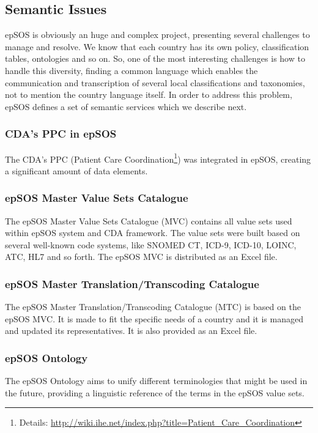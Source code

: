 \subsection{Semantic Issues}
epSOS is obviously an huge and complex project, presenting several challenges to manage and resolve. We know that each country has its own policy, classification tables, ontologies and so on. So, one of the most interesting challenges is how to handle this diversity, finding a common language which enables the communication and transcription of several local classifications and taxonomies, not to mention the country language itself. In order to address this problem, epSOS defines a set of semantic services which we describe next. 

\subsubsection{CDA's PPC in epSOS}
The CDA's PPC (Patient Care Coordination\footnote{Details: \url{http://wiki.ihe.net/index.php?title=Patient_Care_Coordination}}) was integrated in epSOS, creating a significant amount of data elements.

\subsubsection{epSOS Master Value Sets Catalogue}
The epSOS Master Value Sets Catalogue (MVC) contains all value sets used within epSOS system and CDA framework. The value sets were built based on several well-known code systems, like SNOMED CT, ICD-9, ICD-10, LOINC, ATC, HL7 and so forth. The epSOS MVC is distributed as an Excel file.

\subsubsection{epSOS Master Translation/Transcoding Catalogue}
The epSOS Master Translation/Transcoding Catalogue (MTC) is based on the epSOS MVC. It is made to fit the specific needs of a country and it is managed and updated its representatives. It is also provided as an Excel file.

\subsubsection{epSOS Ontology}
The epSOS Ontology aims to unify different terminologies that might be used in the future, providing a linguistic reference of the terms in the epSOS value sets.



